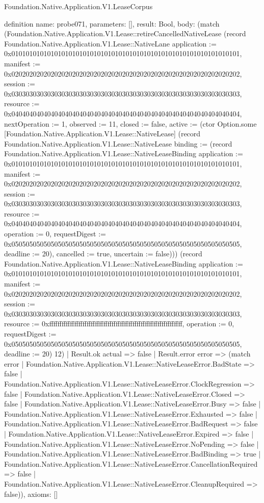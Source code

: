 \begin{lexlean}{Foundation.Native.Application.V1.LeaseCorpus}
\begin{semanticmodule}
definition{
  name: probe071,
  parameters: [],
  result: Bool,
  body: (match (Foundation.Native.Application.V1.Lease::retireCancelledNativeLease (record Foundation.Native.Application.V1.Lease::NativeLane {application := 0x0101010101010101010101010101010101010101010101010101010101010101, manifest := 0x0202020202020202020202020202020202020202020202020202020202020202, session := 0x0303030303030303030303030303030303030303030303030303030303030303, resource := 0x0404040404040404040404040404040404040404040404040404040404040404, nextOperation := 1, observed := 11, closed := false, active := (ctor Option.some [Foundation.Native.Application.V1.Lease::NativeLease] (record Foundation.Native.Application.V1.Lease::NativeLease {binding := (record Foundation.Native.Application.V1.Lease::NativeLeaseBinding {application := 0x0101010101010101010101010101010101010101010101010101010101010101, manifest := 0x0202020202020202020202020202020202020202020202020202020202020202, session := 0x0303030303030303030303030303030303030303030303030303030303030303, resource := 0x0404040404040404040404040404040404040404040404040404040404040404, operation := 0, requestDigest := 0x0505050505050505050505050505050505050505050505050505050505050505, deadline := 20}), cancelled := true, uncertain := false}))}) (record Foundation.Native.Application.V1.Lease::NativeLeaseBinding {application := 0x0101010101010101010101010101010101010101010101010101010101010101, manifest := 0x0202020202020202020202020202020202020202020202020202020202020202, session := 0x0303030303030303030303030303030303030303030303030303030303030303, resource := 0xffffffffffffffffffffffffffffffffffffffffffffffffffffffffffffffff, operation := 0, requestDigest := 0x0505050505050505050505050505050505050505050505050505050505050505, deadline := 20}) 12)
    | Result.ok actual => false
    | Result.error error => (match error
      | Foundation.Native.Application.V1.Lease::NativeLeaseError.BadState => false
      | Foundation.Native.Application.V1.Lease::NativeLeaseError.ClockRegression => false
      | Foundation.Native.Application.V1.Lease::NativeLeaseError.Closed => false
      | Foundation.Native.Application.V1.Lease::NativeLeaseError.Busy => false
      | Foundation.Native.Application.V1.Lease::NativeLeaseError.Exhausted => false
      | Foundation.Native.Application.V1.Lease::NativeLeaseError.BadRequest => false
      | Foundation.Native.Application.V1.Lease::NativeLeaseError.Expired => false
      | Foundation.Native.Application.V1.Lease::NativeLeaseError.NoPending => false
      | Foundation.Native.Application.V1.Lease::NativeLeaseError.BadBinding => true
      | Foundation.Native.Application.V1.Lease::NativeLeaseError.CancellationRequired => false
      | Foundation.Native.Application.V1.Lease::NativeLeaseError.CleanupRequired => false)),
  axioms: []
}


\end{semanticmodule}
\end{lexlean}
